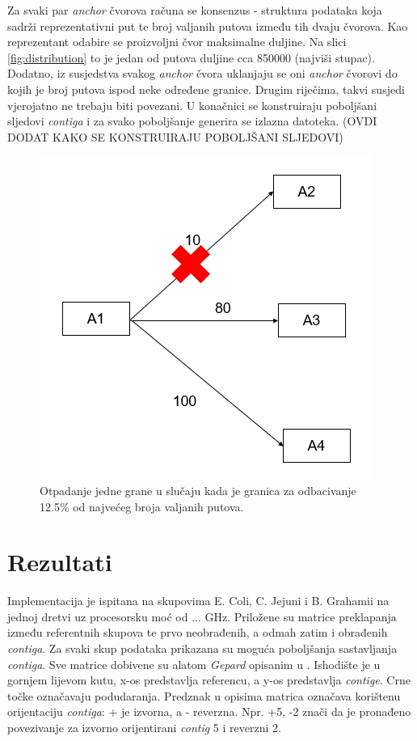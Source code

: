 \documentclass[times, utf8, seminar, numeric]{fer}
\begin{document}
Za svaki par \textit{anchor} čvorova računa se konsenzus - struktura podataka koja sadrži reprezentativni put te broj valjanih putova između tih dvaju čvorova. Kao reprezentant odabire se proizvoljni čvor maksimalne duljine. Na slici \ref{fig:distribution} to je jedan od putova duljine cca 850000 (najviši stupac). Dodatno, iz susjedstva svakog \textit{anchor} čvora uklanjaju se oni \textit{anchor} čvorovi do kojih je broj putova ispod neke određene granice. Drugim riječima, takvi susjedi vjerojatno ne trebaju biti povezani. U konačnici se konstruiraju poboljšani sljedovi \textit{contiga} i za svako poboljšanje generira se izlazna datoteka. (OVDI DODAT KAKO SE KONSTRUIRAJU POBOLJŠANI SLJEDOVI)%

\begin{figure}[h]
	\centering
	\centerline{\includegraphics[width=0.6\linewidth]{img/valid_path_numbers_filtered}}
	\caption{Otpadanje jedne grane u slučaju kada je granica za odbacivanje 12.5\% od najvećeg broja valjanih putova.}
	\label{fig:validpathnumbersfiltered}
\end{figure}

\chapter{Rezultati}
Implementacija je ispitana na skupovima E. Coli, C. Jejuni i B. Grahamii na jednoj dretvi uz procesorsku moć od ... GHz. Priložene su matrice preklapanja između referentnih skupova te prvo neobrađenih, a odmah zatim i obrađenih \textit{contiga}. Za svaki skup podataka prikazana su moguća poboljšanja sastavljanja \textit{contiga}. Sve matrice dobivene su alatom \textit{Gepard} opisanim u \cite{gepard}. Ishodište je u gornjem lijevom kutu, x-os predstavlja referencu, a y-os predstavlja \textit{contige}. Crne točke označavaju podudaranja. Predznak u opisima matrica označava korištenu orijentaciju \textit{contiga}: + je izvorna, a - reverzna. Npr. +5, -2 znači da je pronađeno povezivanje za izvorno orijentirani \textit{contig} 5 i reverzni 2.
\end{document}
